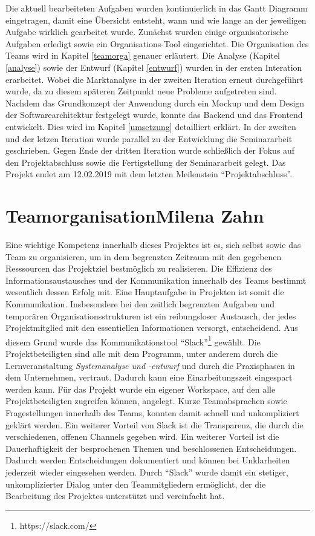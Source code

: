 	Die aktuell bearbeiteten Aufgaben wurden kontinuierlich in das Gantt Diagramm eingetragen, damit eine Übersicht entsteht, wann und wie lange an der jeweiligen Aufgabe wirklich gearbeitet wurde. Zunächst wurden einige organisatorische Aufgaben erledigt sowie ein Organisations-Tool eingerichtet. Die Organisation des Teams wird in Kapitel \vref{teamorga} genauer erläutert. Die Analyse (Kapitel \vref{analyse}) sowie der Entwurf (Kapitel \vref{entwurf}) wurden in der ersten Interation erarbeitet. Wobei die Marktanalyse in der zweiten Iteration erneut durchgeführt wurde, da zu diesem späteren Zeitpunkt neue Probleme aufgetreten sind. Nachdem das Grundkonzept der Anwendung durch ein Mockup und dem Design der Softwarearchitektur festgelegt wurde, konnte das Backend und das Frontend entwickelt. Dies wird im Kapitel \vref{umsetzung} detailliert erklärt. In der zweiten und der letzen Iteration wurde parallel zu der Entwicklung die Seminararbeit geschrieben. Gegen Ende der dritten Iteration wurde schließlich der Fokus auf den Projektabschluss sowie die Fertigstellung der Seminararbeit gelegt. Das Projekt endet am 12.02.2019 mit dem letzten Meilenstein \enquote{Projektabschluss}.
	
	
	\section[Teamorganisation]{Teamorganisation{\hfill \normalsize Milena Zahn}} \label{teamorga}
	Eine wichtige Kompetenz innerhalb dieses Projektes ist es, sich selbst sowie das Team zu organisieren, um in dem begrenzten Zeitraum mit den gegebenen Resssourcen das Projektziel bestmöglich zu realisieren. Die Effizienz des Informationsaustausches und der Kommunikation innerhalb des Teams bestimmt wesentlich dessen Erfolg mit. Eine Hauptaufgabe in Projekten ist somit die Kommunikation\autocite[Vgl.][S. 207]{projektmanagement}. Insbesondere bei den zeitlich begrenzten Aufgaben und temporären Organisationsstrukturen ist ein reibungsloser Austausch, der jedes Projektmitglied mit den essentiellen Informationen versorgt, entscheidend. Aus diesem Grund wurde das Kommunikationstool \enquote{Slack}\footnote{https://slack.com/} gewählt. Die Projektbeteiligten sind alle mit dem Programm, unter anderem durch die Lernveranstaltung \textit{Systemanalyse und -entwurf} und durch die Praxisphasen in dem Unternehmen, vertraut. Dadurch kann eine Einarbeitungszeit eingespart werden kann. Für das Projekt wurde ein eigener Workspace, auf den alle Projektbeteiligten zugreifen können, angelegt. Kurze Teamabsprachen sowie Fragestellungen innerhalb des Teams, konnten damit schnell und unkompliziert geklärt werden. Ein weiterer Vorteil von Slack ist die Transparenz, die durch die verschiedenen, offenen Channels gegeben wird. Ein weiterer Vorteil ist die Dauerhaftigkeit der besprochenen Themen und beschlossenen Entscheidungen. Dadurch werden Entscheidungen dokumentiert und können bei Unklarheiten jederzeit wieder eingesehen werden. Durch \enquote{Slack} wurde damit ein stetiger, unkomplizierter Dialog unter den Teammitgliedern ermöglicht, der die Bearbeitung des Projektes unterstützt und vereinfacht hat.
	
